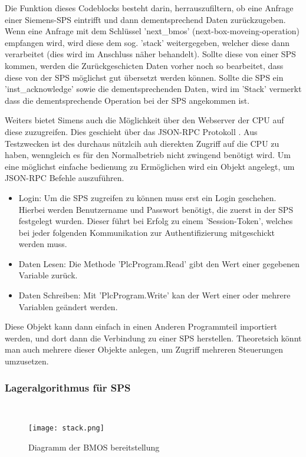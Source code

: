 Die Funktion dieses Codeblocks besteht darin, herrauszufiltern, ob eine Anfrage einer Siemens-SPS eintrifft und dann dementsprechend Daten zurückzugeben.
Wenn eine Anfrage mit dem Schlüssel 'next\_bmos' (next-box-moveing-operation) empfangen wird, wird diese dem sog. 'stack' weitergegeben, welcher diese dann verarbeitet (dies wird im Anschluss näher behandelt). Sollte diese von einer SPS kommen, werden die Zurückgeschicten Daten vorher noch so bearbeitet, dass diese von der SPS möglichst gut übersetzt werden können.
Sollte die SPS ein 'inst\_acknowledge' sowie die dementsprechenden Daten, wird im 'Stack' vermerkt dass die dementsprechende Operation bei der SPS angekommen ist.

Weiters bietet Simens auch die Möglichkeit über den Webserver der CPU auf diese zuzugreifen. Dies geschieht über das JSON-RPC Protokoll \cite{ws_s7}. Aus Testzwecken ist des durchaus nützlcih auh dierekten Zugriff auf die CPU zu haben, wenngleich es für den Normalbetrieb nicht zwingend benötigt wird. Um eine möglichst einfache bedienung zu Ermöglichen wird ein Objekt angelegt, um JSON-RPC Befehle auszuführen.

\begin{itemize}
    \item Login: Um die SPS zugreifen zu können muss erst ein Login geschehen. Hierbei werden Benutzername und Passwort benötigt, die zuerst in der SPS festgelegt wurden. Dieser führt bei Erfolg zu einem 'Session-Token', welches bei jeder folgenden Kommunikation zur Authentifizierung mitgeschickt werden muss.
    \item Daten Lesen: Die Methode 'PlcProgram.Read' gibt den Wert einer gegebenen Variable zurück.
    \item Daten Schreiben: Mit 'PlcProgram.Write' kan der Wert einer oder mehrere Variablen geändert werden.
\end{itemize}

Diese Objekt kann dann einfach in einen Anderen Programmteil importiert werden, und dort dann die Verbindung zu einer SPS herstellen. Theoretsich könnt man auch mehrere dieser Objekte anlegen, um Zugriff mehreren Steuerungen umzusetzen.

\subsubsection{Lageralgorithmus für SPS}\mbox{}\\

\begin{wrapfigure}{R}{0.6\textwidth}
    \centering
    \texttt{[image: stack.png]}
    \caption{Diagramm der BMOS bereitstellung}
\end{wrapfigure}

